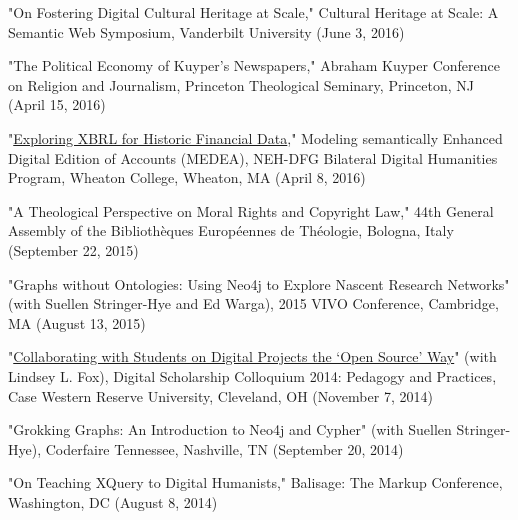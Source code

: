 \documentclass[10pt]{res} %
\begin{document}
\begin{resume}
\begin{hangparas}{.25in}{1}"On Fostering Digital Cultural Heritage at Scale," Cultural Heritage at Scale: A Semantic Web Symposium, Vanderbilt University (June 3, 2016)\end{hangparas}

\begin{hangparas}{.25in}{1}"The Political Economy of Kuyper’s Newspapers," Abraham Kuyper Conference on Religion and Journalism, Princeton Theological Seminary, Princeton, NJ (April 15, 2016)\end{hangparas}

\begin{hangparas}{.25in}{1}"\href{http://medea.hypotheses.org/497}{Exploring XBRL for Historic Financial Data}," Modeling semantically Enhanced Digital Edition of Accounts (MEDEA), NEH-DFG Bilateral Digital Humanities Program, Wheaton College, Wheaton, MA (April 8, 2016)\end{hangparas}

\begin{hangparas}{.25in}{1}"A Theological Perspective on Moral Rights and Copyright Law," 44th General Assembly of the Bibliothèques Européennes de Théologie, Bologna, Italy (September 22, 2015)\end{hangparas}

\begin{hangparas}{.25in}{1}"Graphs without Ontologies: Using Neo4j to Explore Nascent Research Networks" (with Suellen Stringer-Hye and Ed Warga), 2015 VIVO Conference, Cambridge, MA (August 13, 2015)\end{hangparas}

\begin{hangparas}{.25in}{1}"\href{https://www.youtube.com/watch?v=-Hbg6r3JZAQ}{Collaborating with Students on Digital Projects the ‘Open Source’ Way}" (with Lindsey L. Fox), Digital Scholarship Colloquium 2014: Pedagogy and Practices, Case Western Reserve University, Cleveland, OH (November 7, 2014)\end{hangparas}

\begin{hangparas}{.25in}{1}"Grokking Graphs: An Introduction to Neo4j and Cypher" (with Suellen Stringer-Hye), Coderfaire Tennessee, Nashville, TN (September 20, 2014)\end{hangparas}

\begin{hangparas}{.25in}{1}"On Teaching XQuery to Digital Humanists," Balisage: The Markup Conference, Washington, DC (August 8, 2014)\end{hangparas}


\end{resume}
\end{document}
